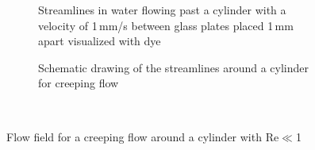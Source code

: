 \begin{figure}[H]
          \begin{subfigure}{0.49\textwidth}
                  \flushleft
                  \caption{Streamlines in water flowing past a cylinder with a velocity of 1\,mm/s between glass plates placed 1\,mm apart visualized with dye \cite{van1982album}\label{fig:creep_1}}
          \end{subfigure}\hfill
        \begin{subfigure}{0.49\textwidth}
                \flushright
                \caption{Schematic drawing of the streamlines around a cylinder for creeping flow}\label{fig:creep_2}
        \end{subfigure}
        \\
        
        \caption[Creeping flow around a cylinder]{Flow field for a creeping flow around a cylinder with Re$\ll$1 }
        \label{fig:creep_tot}
  \end{figure}

